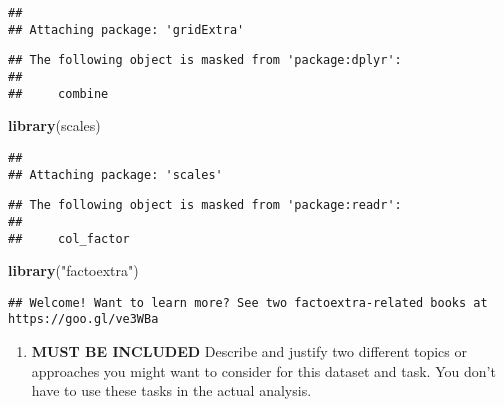 \documentclass[
  a3paper,
]{article}
\newenvironment{Shaded}{\begin{snugshade}}{\end{snugshade}}
\newcommand{\FunctionTok}[1]{\textcolor[rgb]{0.13,0.29,0.53}{\textbf{#1}}}
\newcommand{\NormalTok}[1]{#1}
\newcommand{\OtherTok}[1]{\textcolor[rgb]{0.56,0.35,0.01}{#1}}
\newcommand{\SpecialCharTok}[1]{\textcolor[rgb]{0.81,0.36,0.00}{\textbf{#1}}}
\newcommand{\StringTok}[1]{\textcolor[rgb]{0.31,0.60,0.02}{#1}}
\providecommand{\tightlist}{%
  \setlength{\itemsep}{0pt}\setlength{\parskip}{0pt}}
\begin{document}
\begin{verbatim}
## 
## Attaching package: 'gridExtra'
\end{verbatim}

\begin{verbatim}
## The following object is masked from 'package:dplyr':
## 
##     combine
\end{verbatim}

\begin{Shaded}
\begin{Highlighting}[]
\FunctionTok{library}\NormalTok{(scales)}
\end{Highlighting}
\end{Shaded}

\begin{verbatim}
## 
## Attaching package: 'scales'
\end{verbatim}

\begin{verbatim}
## The following object is masked from 'package:readr':
## 
##     col_factor
\end{verbatim}

\begin{Shaded}
\begin{Highlighting}[]
\FunctionTok{library}\NormalTok{(}\StringTok{"factoextra"}\NormalTok{)}
\end{Highlighting}
\end{Shaded}

\begin{verbatim}
## Welcome! Want to learn more? See two factoextra-related books at https://goo.gl/ve3WBa
\end{verbatim}

\begin{Shaded}
\end{Shaded}

\newpage

\vspace{2cm}

\begin{enumerate}
\def\labelenumi{\arabic{enumi})}
\tightlist
\item
  \textbf{MUST BE INCLUDED} Describe and justify two different topics or
  approaches you might want to consider for this dataset and task. You
  don't have to use these tasks in the actual analysis.
\end{enumerate}
\end{document}
